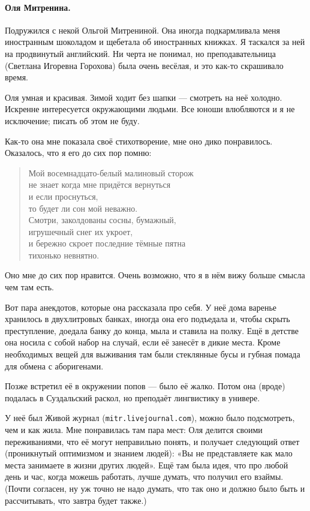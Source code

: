 \documentclass{book}
\begin{document}
\paragraph{Оля Митренина.}
Подружился с некой Ольгой Митрениной.
Она иногда подкармливала меня иностранным шоколадом и щебетала об иностранных книжках.
Я таскался за ней на продвинутый английский.
Ни черта не понимал, но преподавательница (Светлана Игоревна Горохова) была очень весёлая, и это как-то скрашивало время.

Оля умная и красивая.
Зимой ходит без шапки --- смотреть на неё холодно.
Искренне интересуется окружающими людьми.
Все юноши влюбляются и я не исключение; писать об этом не буду.

Как-то она мне показала своё стихотворение, мне оно дико понравилось.
Оказалось, что я его до сих пор помню:
\begin{verse}
Мой восемнадцато-белый малиновый сторож
\\
\qquad не знает когда мне придётся вернуться
\\
\qquad\qquad  и если проснуться,
\\
\qquad\qquad\qquad то будет ли сон мой неважно.
\\
Смотри, заколдованы сосны, бумажный,
\\
\qquad игрушечный снег их укроет,
\\
\qquad\qquad и бережно скроет последние тёмные пятна
\\
\qquad\qquad\qquad тихонько невнятно.
\end{verse}
Оно мне до сих пор нравится.
Очень возможно, что я в нём вижу больше смысла чем там есть.

Вот пара анекдотов, которые она рассказала про себя.
У неё дома варенье хранилось в двухлитровых банках,
иногда она его подъедала и, чтобы скрыть преступление, доедала банку до конца, мыла и ставила на полку.
Ещё в детстве она носила с собой набор на случай, если её занесёт в дикие места.
Кроме необходимых вещей для выживания там были стеклянные бусы и губная помада для обмена с аборигенами. 

Позже встретил её в окружении попов --- было её жалко.
Потом она (вроде) подалась в Суздальский раскол, но преподаёт лингвистику в универе.

У неё был Живой журнал (\texttt{mitr.livejournal.com}), можно было подсмотреть, чем и как жила.
Мне понравилась там пара мест:
Оля делится своими переживаниями, что её могут неправильно понять, и получает следующий ответ (проникнутый оптимизмом и знанием людей): «Вы не представляете как мало места занимаете в жизни других людей».
Ещё там была идея, что про любой день и час, когда можешь работать, лучше думать, что получил его взаймы.
(Почти согласен, ну уж точно не надо думать, что так оно и должно было быть и рассчитывать, что завтра будет также.)
\end{document}
